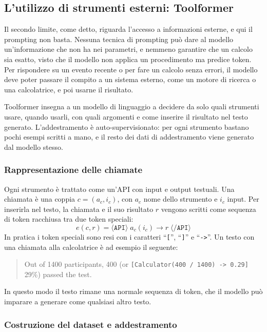 \subsection{L'utilizzo di strumenti esterni: Toolformer}
\label{sec:toolformer}

Il secondo limite, come detto, riguarda l'accesso a informazioni esterne, e qui il prompting non basta. Nessuna tecnica di prompting può dare al modello un'informazione che non ha nei parametri, e nemmeno garantire che un calcolo sia esatto, visto che il modello non applica un procedimento ma predice token. Per rispondere su un evento recente o per fare un calcolo senza errori, il modello deve poter passare il compito a un sistema esterno, come un motore di ricerca o una calcolatrice, e poi usarne il risultato.

Toolformer \cite{schick2023toolformer} insegna a un modello di linguaggio a decidere da solo quali strumenti usare, quando usarli, con quali argomenti e come inserire il risultato nel testo generato. L'addestramento è auto-supervisionato: per ogni strumento bastano pochi esempi scritti a mano, e il resto dei dati di addestramento viene generato dal modello stesso.

\subsubsection{Rappresentazione delle chiamate}

Ogni strumento è trattato come un'API con input e output testuali. Una chiamata è una coppia $c = (a_c, i_c)$, con $a_c$ nome dello strumento e $i_c$ input. Per inserirla nel testo, la chiamata e il suo risultato $r$ vengono scritti come sequenza di token racchiusa tra due token speciali:
\[
e(c, r) = \langle\texttt{API}\rangle\; a_c(i_c) \rightarrow r\; \langle\texttt{/API}\rangle
\]
In pratica i token speciali sono resi con i caratteri ``\texttt{[}'', ``\texttt{]}'' e ``\texttt{->}''. Un testo con una chiamata alla calcolatrice è ad esempio il seguente:
\begin{quote}
\small Out of 1400 participants, 400 (or \texttt{[Calculator(400 / 1400) -> 0.29]} 29\%) passed the test.
\end{quote}
In questo modo il testo rimane una normale sequenza di token, che il modello può imparare a generare come qualsiasi altro testo.

\subsubsection{Costruzione del dataset e addestramento}

